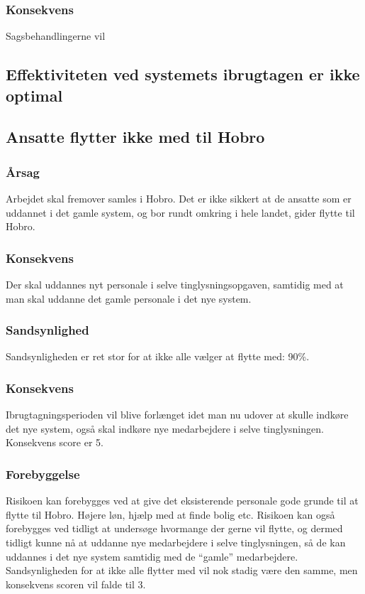 \documentclass[10pt,a4paper,danish]{article}
\begin{document}
\subsubsection{Konsekvens}
Sagsbehandlingerne vil 





\subsection{Effektiviteten ved systemets ibrugtagen er ikke optimal}


\subsection{Ansatte flytter ikke med til Hobro}
\subsubsection{Årsag}
Arbejdet skal fremover samles i Hobro. Det er ikke sikkert at de ansatte som er uddannet i det gamle system, og bor rundt omkring i hele landet, gider flytte til Hobro.

\subsubsection{Konsekvens}
Der skal uddannes nyt personale i selve tinglysningsopgaven, samtidig med at man skal uddanne det gamle personale i det nye system.

\subsubsection{Sandsynlighed}
Sandsynligheden er ret stor for at ikke alle vælger at flytte med: 90\%.

\subsubsection{Konsekvens}
Ibrugtagningsperioden vil blive forlænget idet man nu udover at skulle indkøre det nye system, også skal indkøre nye medarbejdere i selve tinglysningen. Konsekvens score er 5.

\subsubsection{Forebyggelse}
Risikoen kan forebygges ved at give det eksisterende personale gode grunde til at flytte til Hobro. Højere løn, hjælp med at finde bolig etc. Risikoen kan også forebygges ved tidligt at undersøge hvormange der gerne vil flytte, og dermed tidligt kunne nå at uddanne nye medarbejdere i selve tinglysningen, så de kan uddannes i det nye system samtidig med de "`gamle"' medarbejdere. Sandsynligheden for at ikke alle flytter med vil nok stadig være den samme, men konsekvens scoren vil falde til 3.
\end{document}
